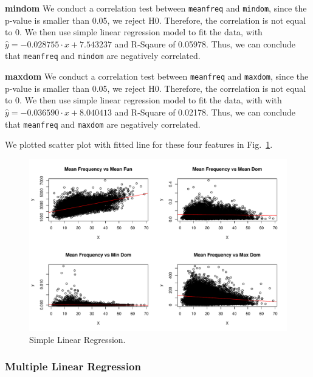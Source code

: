 \documentclass{article}
\begin{document}
	
	\textbf{mindom} We conduct a correlation test between \texttt{meanfreq} and \texttt{mindom}, since the p-value is smaller than 0.05, we reject H0. Therefore, the correlation is not equal to 0. We then use simple linear regression model to fit the data, with $\hat{y}=-0.028755\cdot x + 7.543237$ and R-Sqaure of 0.05978. Thus, we can conclude that \texttt{meanfreq} and \texttt{mindom} are negatively correlated.
	
	\textbf{maxdom} We conduct a correlation test between \texttt{meanfreq} and \texttt{maxdom}, since the p-value is smaller than 0.05, we reject H0. Therefore, the correlation is not equal to 0. We then use simple linear regression model to fit the data, with with $\hat{y}=-0.036590\cdot x + 8.040413$ and R-Square of 0.02178. Thus, we can conclude that \texttt{meanfreq} and \texttt{maxdom} are negatively correlated.
	
	We plotted scatter plot with fitted line for these four features in Fig.~\ref{simple_lr}.
	\begin{figure}
		\centering
		\includegraphics[width=\textwidth]{graphs/simple_linear_regression_plot.pdf}
		\caption{Simple Linear Regression.}
		\label{simple_lr}
	\end{figure}
	
	
	\subsubsection{Multiple Linear Regression}
	
\end{document}
